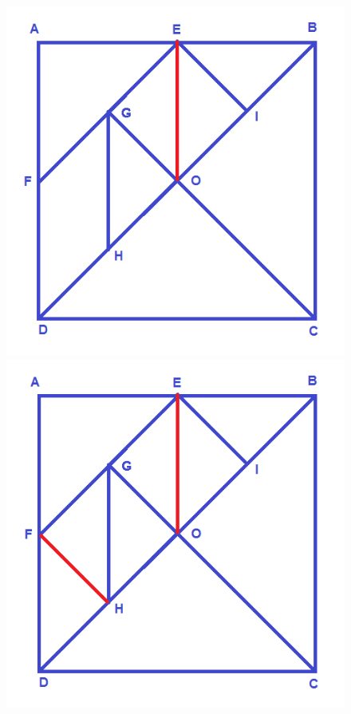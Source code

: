 	\begin{figure}[H]
	\centering
	\vspace*{-10pt}
	\includegraphics[scale=0.2]{image10}\quad
	\includegraphics[scale=0.2]{image11}\quad

\end{figure}
